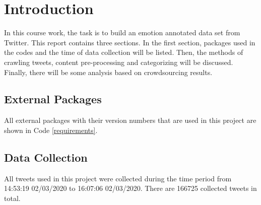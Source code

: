 \section{Introduction}

\renewcommand{\lstlistingname}{Code}

In this course work, the task is to build an emotion	annotated data set from Twitter. This report contains three sections. In the first section, packages used in the codes and the time of data collection will be listed. Then, the methods of crawling tweets, content pre-processing and categorizing will be discussed. Finally, there will be some analysis based on crowdsourcing results.

\subsection{External Packages}



All external packages with their version numbers that are used in this project are shown in Code \ref{requirements}.

\subsection{Data Collection}

All tweets used in this project were collected during the time period from 14:53:19 02/03/2020 to 16:07:06 02/03/2020. There are 166725 collected tweets in total.

